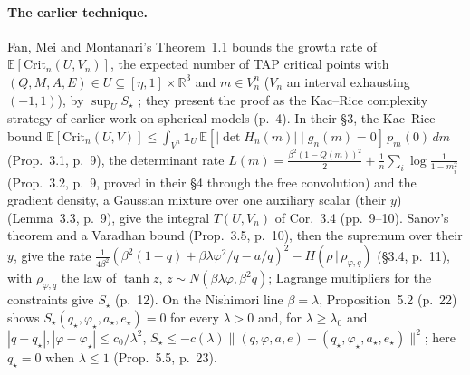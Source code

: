 \documentclass[11pt]{article}
\newcommand{\R}{\mathbb{R}}
\newcommand{\E}{\mathbb{E}}
\newcommand{\one}{\mathbf{1}}
\newcommand{\norm}[1]{\lVert #1\rVert}
\newcommand{\sloc}[2]{\cite[#2]{#1}}
\begin{document}
\paragraph{The earlier technique.}
Fan, Mei and Montanari's Theorem~1.1 bounds the growth rate of
$\E[\mathrm{Crit}_n(U,V_n)]$, the expected number of TAP critical points with
$(Q,M,A,E)\in U\subseteq[\eta,1]\times\R^3$ and $m\in V_n^n$ ($V_n$ an interval
exhausting $(-1,1)$), by $\sup_US_\star$
\sloc{FanMeiMontanari2018-TAPFreeEnergyVariationalInference}{Thm~1.1, p.~4};
they present the proof as the Kac--Rice complexity strategy of earlier work
on spherical models (p.~4). In their \S3, the Kac--Rice bound
$\E[\mathrm{Crit}_n(U,V)]\le\int_{V^n}\one_U\,\E[|\det H_n(m)|\mid g_n(m)=0]\,p_m(0)\,dm$
(Prop.~3.1, p.~9), the determinant rate
$L(m)=\frac{\beta^2(1-Q(m))^2}{2}+\frac1n\sum_i\log\frac1{1-m_i^2}$
(Prop.~3.2, p.~9, proved in their \S4 through the free convolution) and the
gradient density, a Gaussian mixture over one auxiliary scalar (their $y$)
(Lemma~3.3, p.~9), give the integral $T(U,V_n)$ of Cor.~3.4 (pp.~9--10).
Sanov's theorem and a Varadhan bound (Prop.~3.5, p.~10), then the supremum
over their $y$, give the rate
$\frac1{4\beta^2}(\beta^2(1-q)+\beta\lambda\varphi^2/q-a/q)^2-H(\rho\,|\,\rho_{\varphi,q})$
(\S3.4, p.~11), with $\rho_{\varphi,q}$ the law of $\tanh z$, $z\sim N(\beta\lambda\varphi,\beta^2q)$;
Lagrange multipliers for the constraints give $S_\star$ (p.~12). On the
Nishimori line $\beta=\lambda$, Proposition~5.2 (p.~22) shows
$S_\star(q_\star,\varphi_\star,a_\star,e_\star)=0$ for every $\lambda>0$ and,
for $\lambda\ge\lambda_0$ and $|q-q_\star|,|\varphi-\varphi_\star|\le c_0/\lambda^2$,
$S_\star\le-c(\lambda)\norm{(q,\varphi,a,e)-(q_\star,\varphi_\star,a_\star,e_\star)}^2$;
here $q_\star=0$ when $\lambda\le1$ (Prop.~5.5, p.~23).
\end{document}
